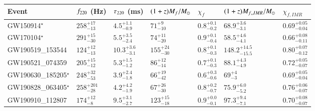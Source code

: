 \begin{tabular}{lllllll}
\toprule
Event & $f_{\text{220}}$ (Hz) & $\tau_{\text{220}}$ (ms) & $(1+z)M_f/M_{\odot}$ & $\chi_f$ & $(1+z)M_{f,,IMR}/M_{\odot}$ & $\chi_{f,IMR}$\\[0.075cm]
\midrule
\hline

GW150914$^\star$ &
$258^{+17}_{-13}$ &
$4.5^{+1.1}_{-0.9}$ &
$71^{+9}_{-10}$ &
$0.8^{+0.1}_{-0.2}$ &
$68.9^{+3.6}_{-3.1}$ &
$0.69^{+0.05}_{-0.04}$
\\[0.075cm]

GW170104$^\star$ &
$291^{+15}_{-30}$ &
$5.5^{+3.5}_{-2.4}$ &
$74^{+11}_{-20}$ &
$0.9^{+0.1}_{-0.4}$&
$58.5^{+4.6}_{-4.1}$ &
$0.66^{+0.08}_{-0.11}$
\\[0.075cm]

GW190519\_153544 &
$124^{+12}_{-13}$ &
$10.3^{+3.6}_{-3.1}$ &
$155^{+24}_{-30}$ &
$0.8^{+0.1}_{-0.3}$&
$148.2^{+14.5}_{-15.5}$ &
$0.80^{+0.07}_{-0.12}$
\\[0.075cm]

GW190521\_074359 &
$205^{+15}_{-12}$ &
$5.3^{+1.5}_{-1.2}$ &
$86^{+12}_{-14}$ &
$0.7^{+0.1}_{-0.3}$&
$88.1^{+4.3}_{-4.9}$ &
$0.72^{+0.05}_{-0.07}$
\\[0.075cm]

GW190630\_185205$^\star$ &
$248^{+32}_{-53}$ &
$3.9^{+2.4}_{-1.8}$ &
$66^{+19}_{-42}$ &
$0.6^{+0.3}_{-0.6}$&
$69^{+4}_{-3}$ &
$0.69^{+0.05}_{-0.04}$
\\[0.075cm]

GW190828\_063405$^\star$ &
$258^{+201}_{-28}$ &
$4.2^{+4.2}_{-1.9}$ &
$67^{+26}_{-30}$ &
$0.8^{+0.2}_{-0.7}$&
$75.9^{+6.0}_{-5.2}$ &
$0.76^{+0.06}_{-0.07}$
\\[0.075cm]

GW190910\_112807 &
$174^{+12}_{-8}$ &
$9.5^{+3.1}_{-2.7}$ &
$123^{+15}_{-18}$ &
$0.9^{+0.0}_{-0.1}$&
$97.3^{+9.4}_{-7.1}$ &
$0.70^{+0.08}_{-0.07}$
\\[0.075cm]

\bottomrule
\end{tabular}